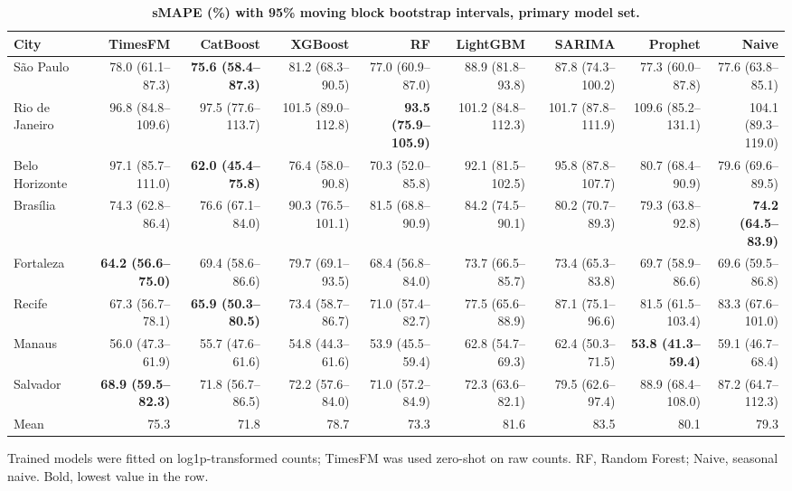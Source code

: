 \documentclass[10pt,letterpaper]{article}
\begin{document}
\begin{landscape}
\begin{table}[!ht]
\centering
\footnotesize
\setlength{\tabcolsep}{3pt}
\caption{\textbf{sMAPE (\%) with 95\% moving block bootstrap intervals, primary model set.}}
\begin{tabular}{lrrrrrrrr}
\toprule
City & TimesFM & CatBoost & XGBoost & RF & LightGBM & SARIMA & Prophet & Naive \\
\midrule
S\~ao Paulo & 78.0 (61.1--87.3) & \textbf{75.6 (58.4--87.3)} & 81.2 (68.3--90.5) & 77.0 (60.9--87.0) & 88.9 (81.8--93.8) & 87.8 (74.3--100.2) & 77.3 (60.0--87.8) & 77.6 (63.8--85.1) \\
Rio de Janeiro & 96.8 (84.8--109.6) & 97.5 (77.6--113.7) & 101.5 (89.0--112.8) & \textbf{93.5 (75.9--105.9)} & 101.2 (84.8--112.3) & 101.7 (87.8--111.9) & 109.6 (85.2--131.1) & 104.1 (89.3--119.0) \\
Belo Horizonte & 97.1 (85.7--111.0) & \textbf{62.0 (45.4--75.8)} & 76.4 (58.0--90.8) & 70.3 (52.0--85.8) & 92.1 (81.5--102.5) & 95.8 (87.8--107.7) & 80.7 (68.4--90.9) & 79.6 (69.6--89.5) \\
Bras\'ilia & 74.3 (62.8--86.4) & 76.6 (67.1--84.0) & 90.3 (76.5--101.1) & 81.5 (68.8--90.9) & 84.2 (74.5--90.1) & 80.2 (70.7--89.3) & 79.3 (63.8--92.8) & \textbf{74.2 (64.5--83.9)} \\
Fortaleza & \textbf{64.2 (56.6--75.0)} & 69.4 (58.6--86.6) & 79.7 (69.1--93.5) & 68.4 (56.8--84.0) & 73.7 (66.5--85.7) & 73.4 (65.3--83.8) & 69.7 (58.9--86.6) & 69.6 (59.5--86.8) \\
Recife & 67.3 (56.7--78.1) & \textbf{65.9 (50.3--80.5)} & 73.4 (58.7--86.7) & 71.0 (57.4--82.7) & 77.5 (65.6--88.9) & 87.1 (75.1--96.6) & 81.5 (61.5--103.4) & 83.3 (67.6--101.0) \\
Manaus & 56.0 (47.3--61.9) & 55.7 (47.6--61.6) & 54.8 (44.3--61.6) & 53.9 (45.5--59.4) & 62.8 (54.7--69.3) & 62.4 (50.3--71.5) & \textbf{53.8 (41.3--59.4)} & 59.1 (46.7--68.4) \\
Salvador & \textbf{68.9 (59.5--82.3)} & 71.8 (56.7--86.5) & 72.2 (57.6--84.0) & 71.0 (57.2--84.9) & 72.3 (63.6--82.1) & 79.5 (62.6--97.4) & 88.9 (68.4--108.0) & 87.2 (64.7--112.3) \\
\midrule
Mean & 75.3 & 71.8 & 78.7 & 73.3 & 81.6 & 83.5 & 80.1 & 79.3 \\
\bottomrule
\end{tabular}
\begin{flushleft} Trained models were fitted on log1p-transformed counts; TimesFM was used zero-shot on raw counts. RF, Random Forest; Naive, seasonal naive. Bold, lowest value in the row.
\end{flushleft}
\label{tabA}
\end{table}

\end{landscape}
\end{document}
